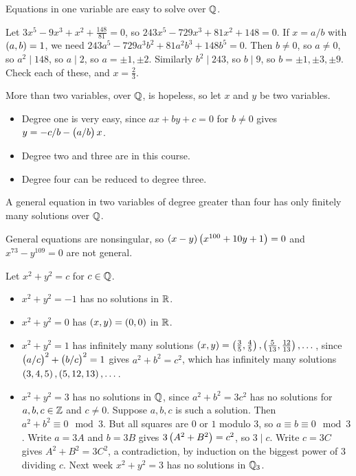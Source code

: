 Equations in one variable are easy to solve over $ \mathbb{Q} $.

\begin{example*}
Let $ 3x^5 - 9x^3 + x^2 + \tfrac{148}{81} = 0 $, so $ 243x^5 - 729x^3 + 81x^2 + 148 = 0 $. If $ x = a / b $ with $ \br{a, b} = 1 $, we need $ 243a^5 - 729a^3b^2 + 81a^2b^3 + 148b^5 = 0 $. Then $ b \ne 0 $, so $ a \ne 0 $, so $ a^2 \mid 148 $, so $ a \mid 2 $, so $ a = \pm 1, \pm 2 $. Similarly $ b^2 \mid 243 $, so $ b \mid 9 $, so $ b = \pm 1, \pm 3, \pm 9 $. Check each of these, and $ x = \tfrac{2}{3} $.
\end{example*}

More than two variables, over $ \mathbb{Q} $, is hopeless, so let $ x $ and $ y $ be two variables.
\begin{itemize}
\item Degree one is very easy, since $ ax + by + c = 0 $ for $ b \ne 0 $ gives $ y = -c / b - \br{a / b}x $.
\item Degree two and three are in this course.
\item Degree four can be reduced to degree three.
\end{itemize}

\begin{theorem}
A general equation in two variables of degree greater than four has only finitely many solutions over $ \mathbb{Q} $.
\end{theorem}

General equations are nonsingular, so $ \br{x - y}\br{x^{100} + 10y + 1} = 0 $ and $ x^{73} - y^{109} = 0 $ are not general.

\begin{example}
Let $ x^2 + y^2 = c $ for $ c \in \mathbb{Q} $.
\begin{itemize}
\item $ x^2 + y^2 = -1 $ has no solutions in $ \mathbb{R} $.
\item $ x^2 + y^2 = 0 $ has $ \br{x, y} = \br{0, 0} $ in $ \mathbb{R} $.
\item $ x^2 + y^2 = 1 $ has infinitely many solutions $ \br{x, y} = \br{\tfrac{3}{5}, \tfrac{4}{5}}, \br{\tfrac{5}{13}, \tfrac{12}{13}}, \dots $, since $ \br{a / c}^2 + \br{b / c}^2 = 1 $ gives $ a^2 + b^2 = c^2 $, which has infinitely many solutions $ \br{3, 4, 5}, \br{5, 12, 13}, \dots $.
\item $ x^2 + y^2 = 3 $ has no solutions in $ \mathbb{Q} $, since $ a^2 + b^2 = 3c^2 $ has no solutions for $ a, b, c \in \mathbb{Z} $ and $ c \ne 0 $. Suppose $ a, b, c $ is such a solution. Then $ a^2 + b^2 \equiv 0 \mod 3 $. But all squares are $ 0 $ or $ 1 $ modulo $ 3 $, so $ a \equiv b \equiv 0 \mod 3 $. Write $ a = 3A $ and $ b = 3B $ gives $ 3\br{A^2 + B^2} = c^2 $, so $ 3 \mid c $. Write $ c = 3C $ gives $ A^2 + B^2 = 3C^2 $, a contradiction, by induction on the biggest power of $ 3 $ dividing $ c $. Next week $ x^2 + y^2 = 3 $ has no solutions in $ \mathbb{Q}_3 $.
\end{itemize}
\end{example}

